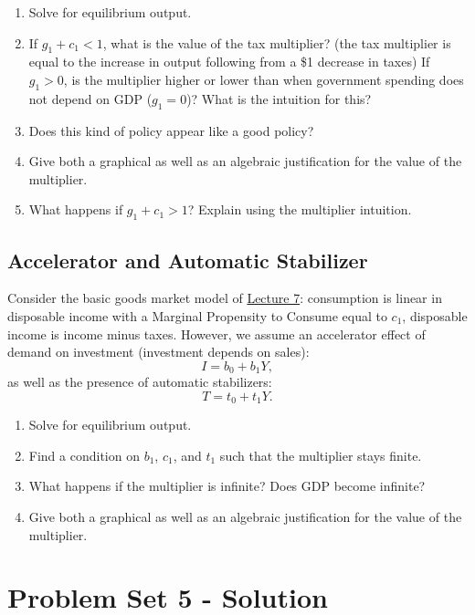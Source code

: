 \documentclass[]{book}
\theoremstyle{definition}
\theoremstyle{definition}
\theoremstyle{definition}
\theoremstyle{remark}
\begin{document}
\begin{enumerate}
\def\labelenumi{\arabic{enumi}.}
\item
  Solve for equilibrium output.
\item
  If \(g_1+c_1<1\), what is the value of the tax multiplier? (the tax
  multiplier is equal to the increase in output following from a \$1
  decrease in taxes) If \(g_1>0\), is the multiplier higher or lower
  than when government spending does not depend on GDP (\(g_1=0\))? What
  is the intuition for this?
\item
  Does this kind of policy appear like a good policy?
\item
  Give both a graphical as well as an algebraic justification for the
  value of the multiplier.
\item
  What happens if \(g_1+c_1>1\)? Explain using the multiplier intuition.
\end{enumerate}

\section{Accelerator and Automatic
Stabilizer}\label{accelerator-and-automatic-stabilizer}

Consider the basic goods market model of
\protect\hyperlink{cons-function}{Lecture 7}: consumption is linear in
disposable income with a Marginal Propensity to Consume equal to
\(c_1\), disposable income is income minus taxes. However, we assume an
accelerator effect of demand on investment (investment depends on
sales): \[I=b_0 + b_1 Y,\] as well as the presence of automatic
stabilizers: \[T=t_0+t_1Y.\]

\begin{enumerate}
\def\labelenumi{\arabic{enumi}.}
\item
  Solve for equilibrium output.
\item
  Find a condition on \(b_1\), \(c_1\), and \(t_1\) such that the
  multiplier stays finite.
\item
  What happens if the multiplier is infinite? Does GDP become infinite?
\item
  Give both a graphical as well as an algebraic justification for the
  value of the multiplier.
\end{enumerate}

\chapter*{Problem Set 5 - Solution}\label{problem-set-5---solution}
\end{document}
